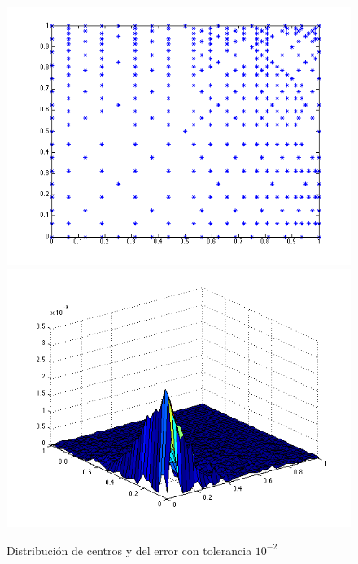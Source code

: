 \documentclass[11pt,a4paper]{article}
\begin{document}
\begin{figure}[H]
\begin{center}
\includegraphics[scale=.4]{edp3_tol2.png}
\includegraphics[scale=.4]{error_edp3_tol2.png}
\caption{Distribución de centros y del error con tolerancia $10^{-2}$}
\end{center}
\end{figure}
\end{document}
